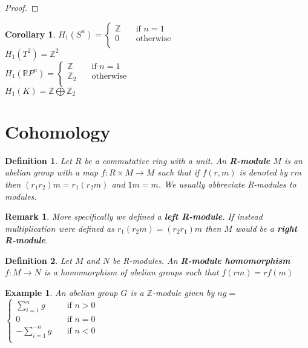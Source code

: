 \documentclass{report}
\newtheorem{definition}{Definition}
\newtheorem{corollary}{Corollary}
\newtheorem{example}{Example}
\newtheorem{remark}{Remark}
\begin{document}
\begin{proof}
\end{proof}

\begin{corollary}
$H_1(S^n)=$$\begin{cases}
       \mathbb{Z} &\quad\text{if }n=1 \\
       0 &\quad\text{otherwise} \\ 
     \end{cases}$\\
$H_1(T^2)=\mathbb{Z}^2$\\
$H_1(\mathbb{R}P^n)=$$\begin{cases}
       \mathbb{Z} &\quad\text{if }n=1 \\
       \mathbb{Z}_2 &\quad\text{otherwise} \\ 
     \end{cases}$\\
$H_1(K)=\mathbb{Z}\bigoplus\mathbb{Z}_2$
\end{corollary}

\section{Cohomology}

\begin{definition}
Let $R$ be a commutative ring with a unit. An \textbf{R-module} $M$ is an abelian group with a map $f\colon R\times M\to M$ such that if $f(r,m)$ is denoted by $rm$ then $(r_1r_2)m=r_1(r_2m)$ and $1m=m$. We usually abbreviate R-modules to modules.
\end{definition}
\begin{remark}
More specifically we defined a \textbf{left R-module}. If instead multiplication were defined as $r_1(r_2m)=(r_2r_1)m$ then $M$ would be a \textbf{right R-module}.
\end{remark}

\begin{definition}
Let $M$ and $N$ be R-modules. An \textbf{R-module homomorphism} $f\colon M\to N$ is a homomorphism of abelian groups such that $f(rm)=rf(m)$ 
\end{definition}

\begin{example}
An abelian group $G$ is a $\mathbb{Z}$-module given by $ng=$$\begin{cases}
       \sum_{i=1}^ng &\quad\text{if }n>0 \\
       0 &\quad\text{if }n=0 \\
       -\sum_{i=1}^{-n}g &\quad\text{if }n<0 \\
     \end{cases}$\\
\end{example}
\end{document}
